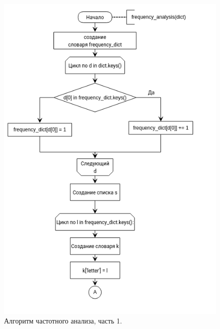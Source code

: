 \documentclass[12pt]{report}
\begin{document}
\begin{figure}[h]
	\begin{center}
		\includegraphics[scale=0.9]{freq1.png}
		\caption{Алгоритм частотного анализа, часть 1.}
		\label{fig:freq1}
	\end{center}
\end{figure}
\end{document}
